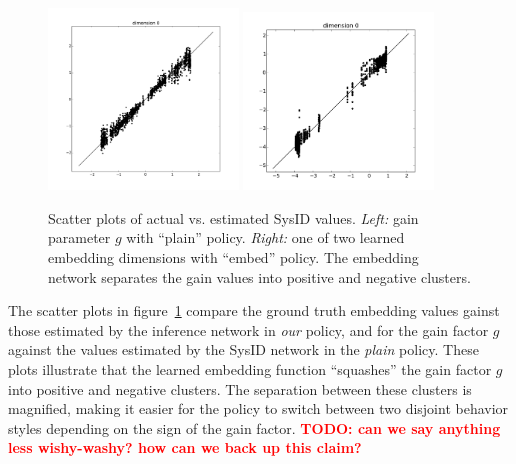 \documentclass{article}
\newcommand{\TODO}[1]{\textcolor{red}{\textbf{TODO: #1}}}
\begin{document}
\begin{figure}
\centering
\includegraphics[width=0.45\textwidth]{pointmass_plain_gain_scatter.pdf}
\includegraphics[width=0.45\textwidth]{pointmass_embed_scatter.pdf}
\caption{Scatter plots of actual vs. estimated SysID values.
\emph{Left:} gain parameter $g$ with ``plain'' policy.
\emph{Right:} one of two learned embedding dimensions with ``embed'' policy.
The embedding network separates the gain values into positive and negative clusters.
}
\label{fig:scatter}
\end{figure}
The scatter plots in figure~\ref{fig:scatter} compare the ground truth embedding values gainst those estimated by the inference network in \emph{our} policy, and for the gain factor $g$ against the values estimated by the SysID network in the \emph{plain} policy.
These plots illustrate that the learned embedding function ``squashes'' the gain factor $g$ into positive and negative clusters.
The separation between these clusters is magnified, making it easier for the policy to switch between two disjoint behavior styles depending on the sign of the gain factor.
\TODO{can we say anything less wishy-washy? how can we back up this claim?}
\end{document}
